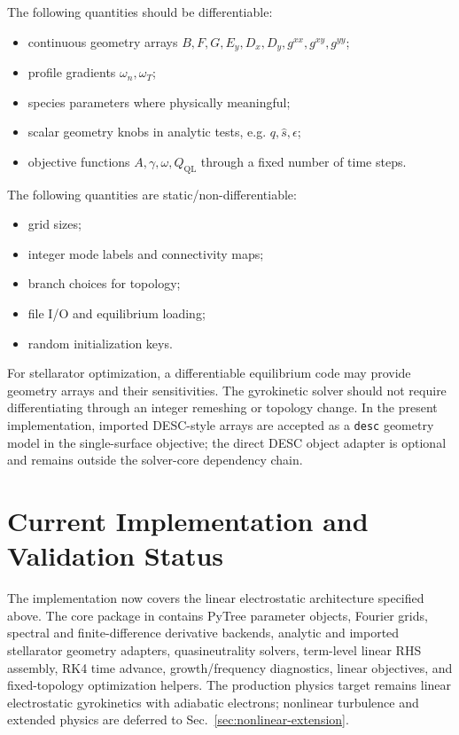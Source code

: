 \documentclass[11pt,a4paper]{article}
\begin{document}
The following quantities should be differentiable:
\begin{itemize}
  \item continuous geometry arrays \(B,F,G,E_y,D_x,D_y,g^{xx},g^{xy},g^{yy}\);
  \item profile gradients \(\omega_n,\omega_T\);
  \item species parameters where physically meaningful;
  \item scalar geometry knobs in analytic tests, e.g. \(q,\hat s,\epsilon\);
  \item objective functions \(A,\gamma,\omega,Q_{\mathrm{QL}}\) through a fixed number of time steps.
\end{itemize}
The following quantities are static/non-differentiable:
\begin{itemize}
  \item grid sizes;
  \item integer mode labels and connectivity maps;
  \item branch choices for topology;
  \item file I/O and equilibrium loading;
  \item random initialization keys.
\end{itemize}
For stellarator optimization, a differentiable equilibrium code may provide geometry arrays and their sensitivities.  The gyrokinetic solver should not require differentiating through an integer remeshing or topology change.
In the present implementation, imported DESC-style arrays are accepted as a
\texttt{desc} geometry model in the single-surface objective; the direct DESC object
adapter is optional and remains outside the solver-core dependency chain.


\section{Current Implementation and Validation Status}
\label{sec:current-status}

The implementation now covers the linear electrostatic architecture specified
above.  The core package in  contains PyTree parameter
objects, Fourier grids, spectral and finite-difference derivative backends,
analytic and imported stellarator geometry adapters, quasineutrality solvers,
term-level linear RHS assembly, RK4 time advance, growth/frequency diagnostics,
linear objectives, and fixed-topology optimization helpers.  The production
physics target remains linear electrostatic gyrokinetics with adiabatic
electrons; nonlinear turbulence and extended physics are deferred to
Sec.~\ref{sec:nonlinear-extension}.
\end{document}
